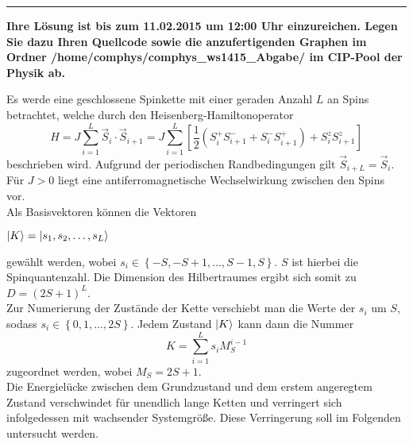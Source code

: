 \documentclass[german,10pt,a4paper]{newexam}
\begin{document}
\vspace*{-1cm}\hrule
\begin{center} 
{\bfseries \sf Ihre L{\"o}sung ist bis zum 11.02.2015 um 12:00 Uhr einzureichen. Legen Sie dazu Ihren Quellcode sowie die anzufertigenden Graphen im Ordner
/home/comphys/comphys\_ws1415\_Abgabe/ im CIP-Pool der Physik ab.}\\[0.3cm]
\end{center}

Es werde eine geschlossene Spinkette mit einer geraden Anzahl $L$ an Spins betrachtet, welche durch den Heisenberg-Hamiltonoperator
\begin{equation*}
H=J\sum_{i=1}^{L}\vec{S}_{i}\cdot\vec{S}_{i+1}=J\sum_{i=1}^{L}\left[\dfrac{1}{2}\left(S_{i}^{+}S_{i+1}^{-}+S_{i}^{-}S_{i+1}^{+}\right)+S_{i}^{z}S_{i+1}^{z}\right]
\end{equation*}
beschrieben wird. Aufgrund der periodischen Randbedingungen gilt $\vec{S}_{i+L}=\vec{S}_{i}$. F{\"u}r $J>0$ liegt eine antiferromagnetische Wechselwirkung zwischen den Spins vor.\\
Als Basisvektoren k{\"o}nnen die Vektoren
\begin{center}
$\ket{K}=|s_1,s_2,\dots,s_L\rangle$
\end{center}
gew{\"a}hlt werden, wobei $s_{i}\in\left\{-S,-S+1,\dots,S-1,S\right\}$. $S$ ist hierbei die Spinquantenzahl. Die Dimension des Hilbertraumes ergibt sich somit zu $D=\left(2S+1\right)^{L}$.\\
Zur Numerierung der Zust{\"a}nde der Kette verschiebt man die Werte der $s_{i}$ um $S$, sodass $s_{i}\in\left\{0,1,\dots,2S\right\}$. Jedem Zustand $\ket{K}$ kann dann die Nummer
\begin{equation*}
K=\sum_{i=1}^{L}s_{i}M_{S}^{i-1}
\end{equation*}
zugeordnet werden, wobei $M_{S}=2S+1$.\\
Die Energiel{\"u}cke zwischen dem Grundzustand und dem erstem angeregtem Zustand verschwindet f{\"u}r unendlich lange Ketten und verringert sich infolgedessen mit wachsender Systemgr{\"o}{\ss}e.
Diese Verringerung soll im Folgenden untersucht werden.
\end{document}
